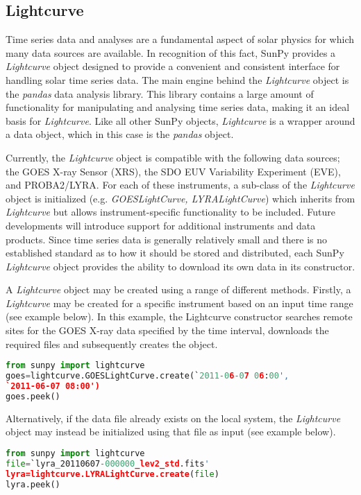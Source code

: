 \subsection{Lightcurve}

Time series data and analyses are a fundamental aspect of solar physics for which many data sources are available. In recognition of this fact, SunPy provides a \textit{Lightcurve} object designed to provide a convenient and consistent interface for handling solar time series data. The main engine behind the \textit{Lightcurve} object is the \textit{pandas} data analysis library. This library contains a large amount of functionality for manipulating and analysing time series data, making it an ideal basis for \textit{Lightcurve}.  Like all other SunPy objects, \textit{Lightcurve} is a wrapper around a data object, which in this case is the \textit{pandas} object. 

Currently, the \textit{Lightcurve} object is compatible with the following data sources; the GOES X-ray Sensor (XRS), the SDO EUV Variability Experiment (EVE), and PROBA2/LYRA. For each of these instruments, a sub-class of the \textit{Lightcurve} object is initialized (e.g. \textit{GOESLightCurve, LYRALightCurve}) which inherits from \textit{Lightcurve} but allows instrument-specific functionality to be included. Future developments will introduce support for additional instruments and data products. 
Since time series data is generally relatively small and there is no established standard as to how it should be stored and distributed, each SunPy \textit{Lightcurve} object provides the ability to download its own data in its constructor.

A \textit{Lightcurve} object may be created using a range of different methods. Firstly, a \textit{Lightcurve} may be created for a specific instrument based on an input time range (see example below). In this example, the Lightcurve constructor searches remote sites for the GOES X-ray data specified by the time interval, downloads the required files and subsequently creates the object.

\begin{lstlisting}[language=Python]
from sunpy import lightcurve
goes=lightcurve.GOESLightCurve.create(`2011-06-07 06:00',
`2011-06-07 08:00')
goes.peek()

\end{lstlisting}

Alternatively, if the data file already exists on the local system, the \textit{Lightcurve} object may instead be initialized using that file as input (see example below).

\begin{lstlisting}[language=Python]
from sunpy import lightcurve
file=`lyra_20110607-000000_lev2_std.fits'
lyra=lightcurve.LYRALightCurve.create(file)
lyra.peek()

\end{lstlisting}

